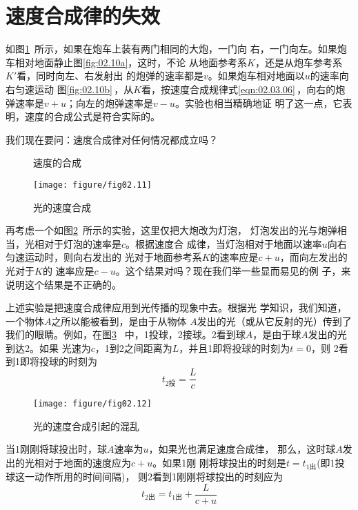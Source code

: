 \documentclass[../outline-of-mechanics.tex]{subfiles}
\begin{document}
\section{速度合成律的失效}\label{sec:02.06}

如图\ref{fig:02.10}~所示，如果在炮车上装有两门相同的大炮，一门向
右，一门向左。如果炮车相对地面静止\lbr 图\ref{fig:02.10a}\rbr，这时，不论
从地面参考系$K$，还是从炮车参考系$K'$看，同时向左、右发射出
的炮弹的速率都是$v$。如果炮车相对地面以$u$的速率向右匀速运动
\lbr 图\ref{fig:02.10b}\,\rbr ，从$K$看，按速度合成规律\lbr 式\eqref{eqn:02.03.06}\,\rbr ，向右的炮
弹速率是$v+u$；向左的炮弹速率是$v-u$。实验也相当精确地证
明了这一点，它表明，速度的合成公式是符合实际的。

我们现在要问：速度合成律对任何情况都成立吗？

\clearpage
\begin{figure}
  \centering
  \hspace{2em}
  \caption{速度的合成}
  \label{fig:02.10}
\end{figure}

\begin{figure}
  \centering
  \texttt{[image: figure/fig02.11]}
  \caption{光的速度合成}
  \label{fig:02.11}
\end{figure}

再考虑一个如图\ref{fig:02.11}~所示的实验，这里仅把大炮改为灯泡，
灯泡发出的光与炮弹相当，光相对于灯泡的速率是$c$。根据速度合
成律，当灯泡相对于地面以速率$u$向右匀速运动时，则向右发出的
光对于地面参考系$K$的速率应是$c+u$，而向左发出的光对于$K$的
速率应是$c-u$。这个结果对吗？现在我们举一些显而易见的例
子，来说明这个结果是不正确的。

上述实验是把速度合成律应用到光传播的现象中去。根据光
学知识，我们知道，一个物体$A$之所以能被看到，是由于从物体
$A$发出的光（或从它反射的光）传到了我们的眼睛。例如，在图\ref{fig:02.12}~
中，1投球，2接球。2看到球$A$，是由于球$A$发出的光到达2。如果
光速为$c$，1到2之间距离为$L$，并且1即将投球的时刻为$t=0$，则
2看到1即将投球的时刻为
\begin{equation*}
  t_{2\text{投}}=\frac{L}{c}
\end{equation*}
\begin{figure}
  \centering
  \texttt{[image: figure/fig02.12]}
  \caption{光的速度合成引起的混乱}
  \label{fig:02.12}
\end{figure}%
当1刚刚将球投出时，球$A$速率为$u$，如果光也满足速度合成律，
那么，这时球$A$发出的光相对于地面的速度应为$c+u$。如果1刚
刚将球投出的时刻是$t=t_{1\text{出}}$(即1投球这一动作所用的时间间隔)，
则2看到1刚刚将球投出的时刻应为
\begin{equation*}
  t_{2\text{出}} = t_{1\text{出}} + \frac{L}{c+u}
\end{equation*}
\end{document}
